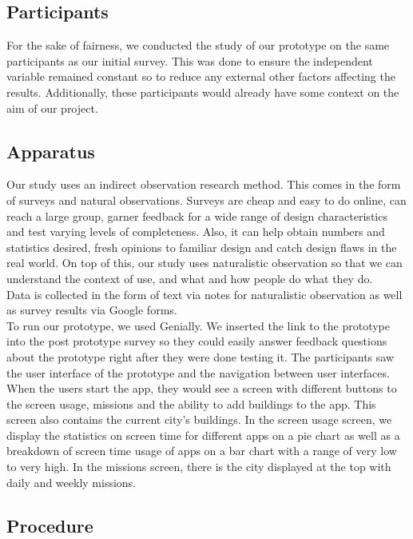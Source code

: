 \documentclass[sigconf, 11pt]{acmart}
\begin{document}
\subsection{Participants}
For the sake of fairness, we conducted the study of our prototype on the same participants as our initial survey. This was done to ensure the independent variable remained constant so to reduce any external other factors affecting the results. Additionally, these participants would already have some context on the aim of our project.

\subsection{Apparatus}
Our study uses an indirect observation research method. This comes in the form of surveys and natural observations. Surveys are cheap and easy to do online, can reach a large group, garner feedback for a wide range of design characteristics and test varying levels of completeness. Also, it can help obtain numbers and statistics desired, fresh opinions to familiar design and catch design flaws in the real world. On top of this, our study uses naturalistic observation so that we can understand the context of use, and what and how people do what they do.
\\

Data is collected in the form of text via notes for naturalistic observation as well as survey results via Google forms.
\\

To run our prototype, we used Genially. We inserted the link to the prototype into the post prototype survey so they could easily answer feedback questions about the prototype right after they were done testing it. The participants saw the user interface of the prototype and the navigation between user interfaces. When the users start the app, they would see a screen with different buttons to the screen usage, missions and the ability to add buildings to the app. This screen also contains the current city’s buildings. In the screen usage screen, we display the statistics on screen time for different apps on a pie chart as well as a breakdown of screen time usage of apps on a bar chart with a range of very low to very high. In the missions screen, there is the city displayed at the top with daily and weekly missions.

\subsection{Procedure}
\end{document}
